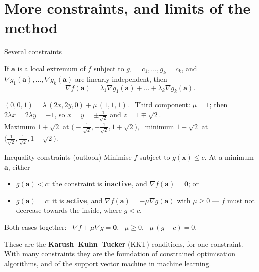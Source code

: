 \documentclass[10pt]{wosm-slides}
\newcommand{\vx}{\mathbf{x}}
\newcommand{\va}{\mathbf{a}}
\begin{document}
\section{More constraints, and limits of the method}

\begin{frame}{Several constraints}
  \begin{theorem}
    If $\va$ is a local extremum of $f$ subject to $g_1 = c_1, \dots, g_k = c_k$, and
    $\nabla g_1(\va), \dots, \nabla g_k(\va)$ are linearly independent, then
    \[ \nabla f(\va) = \lambda_1 \nabla g_1(\va) + \dots + \lambda_k \nabla g_k(\va) . \]
  \end{theorem}
  \pause
  \begin{example}[Extrema of $z$ on the ellipse $x^2 + y^2 = 1$, \ $x + y + z = 1$]
    $(0, 0, 1) = \lambda\,(2x, 2y, 0) + \mu\,(1, 1, 1)$. \ Third component: $\mu = 1$; then
    $2\lambda x = 2\lambda y = -1$, so $x = y = \pm\frac1{\sqrt2}$ and $z = 1 \mp \sqrt2$.
    \pause\\[0.3em]
    Maximum $1 + \sqrt2$ at $\bigl(-\frac1{\sqrt2}, -\frac1{\sqrt2}, 1 + \sqrt2\bigr)$, \
    minimum $1 - \sqrt2$ at $\bigl(\frac1{\sqrt2}, \frac1{\sqrt2}, 1 - \sqrt2\bigr)$.
  \end{example}
\end{frame}

\begin{frame}{Inequality constraints (outlook)}
  Minimise $f$ subject to $g(\vx) \le c$. At a minimum $\va$, either
  \begin{itemize}
    \item $g(\va) < c$: the constraint is \textbf{inactive}, and $\nabla f(\va) = \mathbf 0$; or
    \item $g(\va) = c$: it is \textbf{active}, and $\nabla f(\va) = -\mu\nabla g(\va)$ with $\mu \ge 0$ ---
      $f$ must not decrease towards the inside, where $g < c$.
  \end{itemize}
  \pause
  Both cases together: \ $\nabla f + \mu\nabla g = \mathbf 0$, \ $\mu \ge 0$, \ $\mu\,(g - c) = 0$.
  \pause
  \begin{remark}
    These are the \textbf{Karush--Kuhn--Tucker} (KKT) conditions, for one constraint. With many
    constraints they are the foundation of constrained optimisation algorithms, and of the
    support vector machine in machine learning.
  \end{remark}
\end{frame}
\end{document}
